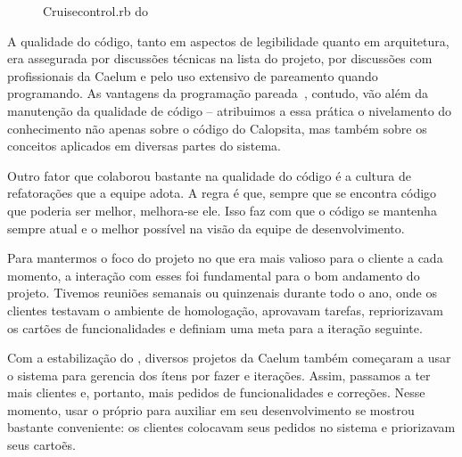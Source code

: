 \begin{figure}[H]
  \centering
  \caption{Cruisecontrol.rb do \calopsita}
\end{figure}

A qualidade do código, tanto em aspectos de legibilidade quanto em arquitetura, era assegurada por discussões técnicas na lista do projeto, por discussões com profissionais da Caelum e pelo uso extensivo de pareamento quando programando. As vantagens da programação pareada~\cite{pair}, contudo, vão além da manutenção da qualidade de código -- atribuimos a essa prática o nivelamento do conhecimento não apenas sobre o código do Calopsita, mas também sobre os conceitos aplicados em diversas partes do sistema.

Outro fator que colaborou bastante na qualidade do código é a cultura de refatorações que a equipe adota. A regra é que, sempre que se encontra código que poderia ser melhor, melhora-se ele. Isso faz com que o código se mantenha sempre atual e o melhor possível na visão da equipe de desenvolvimento.

Para mantermos o foco do projeto no que era mais valioso para o cliente a cada momento, a interação com esses foi fundamental para o bom andamento do projeto. Tivemos reuniões semanais ou quinzenais durante todo o ano, onde os clientes testavam o \calopsita ambiente de homologação, aprovavam tarefas,  repriorizavam os cartões de funcionalidades e definiam uma meta para a iteração seguinte. 

Com a estabilização do \calopsita, diversos projetos da Caelum também começaram a usar o sistema para gerencia dos ítens por fazer e iterações. Assim, passamos a ter mais clientes e, portanto, mais pedidos de funcionalidades e correções. Nesse momento, usar o próprio \calopsita para auxiliar em seu desenvolvimento se mostrou bastante conveniente: os clientes colocavam seus pedidos no sistema e priorizavam seus cartoẽs.

